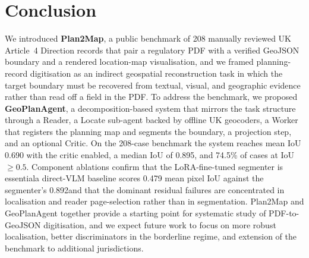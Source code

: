 \documentclass[11pt]{article}
\begin{document}




\section{Conclusion}

We introduced \textbf{Plan2Map}, a public benchmark of 208 manually reviewed UK Article~4 Direction records that pair a regulatory PDF with a verified GeoJSON boundary and a rendered location-map visualisation, and we framed planning-record digitisation as an indirect geospatial reconstruction task in which the target boundary must be recovered from textual, visual, and geographic evidence rather than read off a field in the PDF. To address the benchmark, we proposed \textbf{GeoPlanAgent}, a decomposition-based system that mirrors the task structure through a Reader, a Locate sub-agent backed by offline UK geocoders, a Worker that registers the planning map and segments the boundary, a projection step, and an optional Critic. On the 208-case benchmark the system reaches mean IoU 0.690 with the critic enabled, a median IoU of 0.895, and 74.5\% of cases at IoU $\geq 0.5$. Component ablations confirm that the LoRA-fine-tuned segmenter is essential\textemdash a direct-VLM baseline scores 0.479 mean pixel IoU against the segmenter's 0.892\textemdash and that the dominant residual failures are concentrated in localisation and reader page-selection rather than in segmentation. Plan2Map and GeoPlanAgent together provide a starting point for systematic study of PDF-to-GeoJSON digitisation, and we expect future work to focus on more robust localisation, better discriminators in the borderline regime, and extension of the benchmark to additional jurisdictions.
\end{document}
